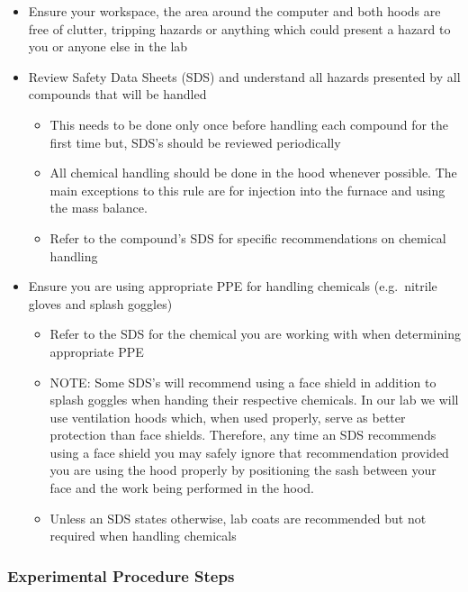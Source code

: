 \begin{itemize}
\tightlist
\item
  Ensure your workspace, the area around the computer and both hoods are
  free of clutter, tripping hazards or anything which could present a
  hazard to you or anyone else in the lab
\item
  Review Safety Data Sheets (SDS) and understand all hazards presented
  by all compounds that will be handled

  \begin{itemize}
  \tightlist
  \item
    This needs to be done only once before handling each compound for
    the first time but, SDS's should be reviewed periodically
  \item
    All chemical handling should be done in the hood whenever possible.
    The main exceptions to this rule are for injection into the furnace
    and using the mass balance.
  \item
    Refer to the compound's SDS for specific recommendations on chemical
    handling
  \end{itemize}
\item
  Ensure you are using appropriate PPE for handling chemicals
  (e.g.~nitrile gloves and splash goggles)

  \begin{itemize}
  \tightlist
  \item
    Refer to the SDS for the chemical you are working with when
    determining appropriate PPE
  \item
    NOTE: Some SDS's will recommend using a face shield in addition to
    splash goggles when handing their respective chemicals. In our lab
    we will use ventilation hoods which, when used properly, serve as
    better protection than face shields. Therefore, any time an SDS
    recommends using a face shield you may safely ignore that
    recommendation provided you are using the hood properly by
    positioning the sash between your face and the work being performed
    in the hood.
  \item
    Unless an SDS states otherwise, lab coats are recommended but not
    required when handling chemicals
  \end{itemize}
\end{itemize}

\hypertarget{experimental-procedure-steps}{%
\subsubsection{Experimental Procedure
Steps}\label{experimental-procedure-steps}}

